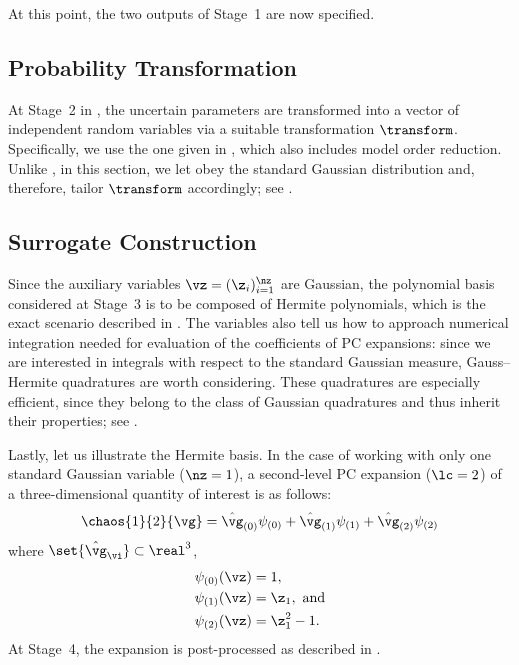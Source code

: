 At this point, the two outputs of Stage~1 are now specified.

\subsection{Probability Transformation}

At Stage~2 in , the uncertain parameters \vu are
transformed into a vector of independent random variables \vz via a suitable
transformation $\transform$. Specifically, we use the one given in
, which also includes model order reduction.
Unlike , in this section, we let \vz obey the
standard Gaussian distribution and, therefore, tailor $\transform$ accordingly;
see .

\subsection{Surrogate Construction}

Since the auxiliary variables $\vz = (\z_i)_{i = 1}^\nz$ are Gaussian, the
polynomial basis considered at Stage~3 is to be composed of Hermite polynomials,
which is the exact scenario described in . The variables
also tell us how to approach numerical integration needed for evaluation of the
coefficients of \ac{PC} expansions: since we are interested in integrals with
respect to the standard Gaussian measure, Gauss--Hermite quadratures
\cite{maitre2010} are worth considering. These quadratures are especially
efficient, since they belong to the class of Gaussian quadratures and thus
inherit their properties; see .

Lastly, let us illustrate the Hermite basis. In the case of working with only
one standard Gaussian variable ($\nz = 1$), a second-level \ac{PC} expansion
($\lc = 2$) of a three-dimensional quantity of interest \vg is as follows:
\[
  \chaos{1}{2}{\vg}
  = \hat{\vg}_{(0)} \psi_{(0)}
  + \hat{\vg}_{(1)} \psi_{(1)}
  + \hat{\vg}_{(2)} \psi_{(2)}
\]
where $\set{\hat{\vg}_{\vi}} \subset \real^3$,
\begin{align*}
  & \psi_{(0)}(\vz) = 1, \\
  & \psi_{(1)}(\vz) = \z_1, \text{ and} \\
  & \psi_{(2)}(\vz) = \z_1^2 - 1.
\end{align*}
At Stage~4, the expansion is post-processed as described in
.
